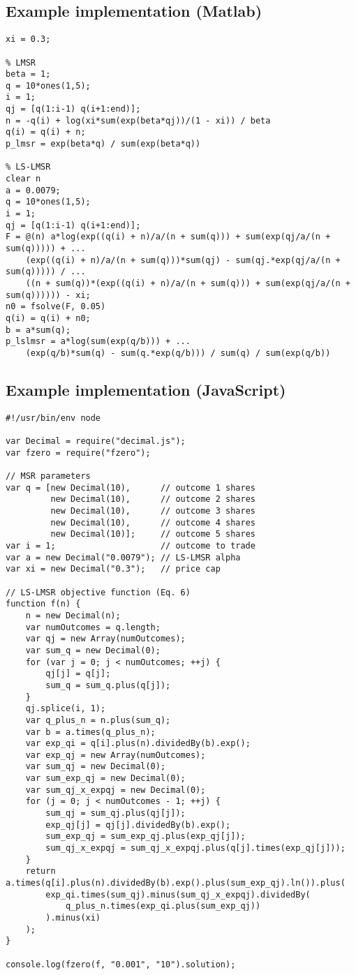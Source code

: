 \documentclass[floatfix,reprint,nofootinbib,amsmath,amssymb,epsfig,pre,floats,letterpaper,groupedaffiliation]{revtex4}
\begin{document}
\subsection*{Example implementation (Matlab)}
\begin{lstlisting}[language=generic]
% price cap
xi = 0.3;

% LMSR
beta = 1;
q = 10*ones(1,5);
i = 1;
qj = [q(1:i-1) q(i+1:end)];
n = -q(i) + log(xi*sum(exp(beta*qj))/(1 - xi)) / beta
q(i) = q(i) + n;
p_lmsr = exp(beta*q) / sum(exp(beta*q))

% LS-LMSR
clear n
a = 0.0079;
q = 10*ones(1,5);
i = 1;
qj = [q(1:i-1) q(i+1:end)];
F = @(n) a*log(exp((q(i) + n)/a/(n + sum(q))) + sum(exp(qj/a/(n + sum(q))))) + ...
    (exp((q(i) + n)/a/(n + sum(q)))*sum(qj) - sum(qj.*exp(qj/a/(n + sum(q))))) / ...
    ((n + sum(q))*(exp((q(i) + n)/a/(n + sum(q))) + sum(exp(qj/a/(n + sum(q)))))) - xi;
n0 = fsolve(F, 0.05)
q(i) = q(i) + n0;
b = a*sum(q);
p_lslmsr = a*log(sum(exp(q/b))) + ...
    (exp(q/b)*sum(q) - sum(q.*exp(q/b))) / sum(q) / sum(exp(q/b))
\end{lstlisting}

\newpage

\subsection*{Example implementation (JavaScript)}
\begin{lstlisting}[language=generic]
#!/usr/bin/env node

var Decimal = require("decimal.js");
var fzero = require("fzero");

// MSR parameters
var q = [new Decimal(10),      // outcome 1 shares
         new Decimal(10),      // outcome 2 shares
         new Decimal(10),      // outcome 3 shares
         new Decimal(10),      // outcome 4 shares
         new Decimal(10)];     // outcome 5 shares
var i = 1;                     // outcome to trade
var a = new Decimal("0.0079"); // LS-LMSR alpha
var xi = new Decimal("0.3");   // price cap

// LS-LMSR objective function (Eq. 6)
function f(n) {
    n = new Decimal(n);
    var numOutcomes = q.length;
    var qj = new Array(numOutcomes);
    var sum_q = new Decimal(0);
    for (var j = 0; j < numOutcomes; ++j) {
        qj[j] = q[j];
        sum_q = sum_q.plus(q[j]);
    }
    qj.splice(i, 1);
    var q_plus_n = n.plus(sum_q);
    var b = a.times(q_plus_n);
    var exp_qi = q[i].plus(n).dividedBy(b).exp();
    var exp_qj = new Array(numOutcomes);
    var sum_qj = new Decimal(0);
    var sum_exp_qj = new Decimal(0);
    var sum_qj_x_expqj = new Decimal(0);
    for (j = 0; j < numOutcomes - 1; ++j) {
        sum_qj = sum_qj.plus(qj[j]);
        exp_qj[j] = qj[j].dividedBy(b).exp();
        sum_exp_qj = sum_exp_qj.plus(exp_qj[j]);
        sum_qj_x_expqj = sum_qj_x_expqj.plus(q[j].times(exp_qj[j]));
    }
    return a.times(q[i].plus(n).dividedBy(b).exp().plus(sum_exp_qj).ln()).plus(
        exp_qi.times(sum_qj).minus(sum_qj_x_expqj).dividedBy(
            q_plus_n.times(exp_qi.plus(sum_exp_qj))
        ).minus(xi)
    );
}

console.log(fzero(f, "0.001", "10").solution);
\end{lstlisting}
\end{document}
